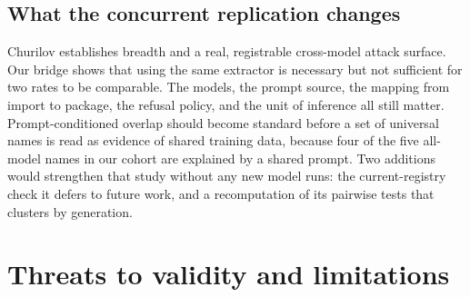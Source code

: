 \documentclass[10pt,twocolumn,letterpaper]{article}
\begin{document}
\subsection{What the concurrent replication changes}

Churilov establishes breadth and a real, registrable cross-model attack surface. Our bridge shows that
using the same extractor is necessary but not sufficient for two rates to be comparable. The models,
the prompt source, the mapping from import to package, the refusal policy, and the unit of inference
all still matter. Prompt-conditioned overlap should become standard before a set of universal names
is read as evidence of shared training data, because four of the five all-model names in our cohort
are explained by a shared prompt. Two additions would strengthen that study without any new model
runs: the current-registry check it defers to future work, and a recomputation of its pairwise tests
that clusters by generation.

\section{Threats to validity and limitations}
\label{sec:threats}
\end{document}
